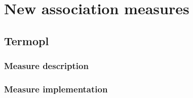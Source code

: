 \chapter{New association measures}

\section{Termopl}

\subsection{Measure description}

\subsection{Measure implementation}